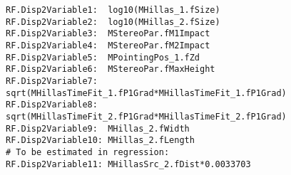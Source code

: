 \begin{lstlisting}
RF.Disp2Variable1:  log10(MHillas_1.fSize)
RF.Disp2Variable2:  log10(MHillas_2.fSize)
RF.Disp2Variable3:  MStereoPar.fM1Impact
RF.Disp2Variable4:  MStereoPar.fM2Impact
RF.Disp2Variable5:  MPointingPos_1.fZd
RF.Disp2Variable6:  MStereoPar.fMaxHeight
RF.Disp2Variable7:  sqrt(MHillasTimeFit_1.fP1Grad*MHillasTimeFit_1.fP1Grad)
RF.Disp2Variable8:  sqrt(MHillasTimeFit_2.fP1Grad*MHillasTimeFit_2.fP1Grad)
RF.Disp2Variable9:  MHillas_2.fWidth
RF.Disp2Variable10: MHillas_2.fLength
# To be estimated in regression:
RF.Disp2Variable11: MHillasSrc_2.fDist*0.0033703
\end{lstlisting}